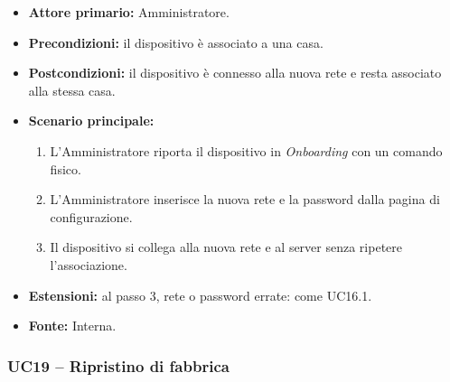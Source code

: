 \documentclass[12pt,a4paper]{article}
\newcommand{\tightlist}{\setlength{\itemsep}{1pt}\setlength{\parskip}{0pt}}
\begin{document}
\begin{itemize}

\tightlist

\item \textbf{Attore primario:} Amministratore.

\item \textbf{Precondizioni:} il dispositivo è associato a una casa.

\item \textbf{Postcondizioni:} il dispositivo è connesso alla nuova rete e resta associato alla stessa casa.

\item \textbf{Scenario principale:}

\begin{enumerate}

\tightlist

\item L'Amministratore riporta il dispositivo in \emph{Onboarding} con un comando fisico.

\item L'Amministratore inserisce la nuova rete e la password dalla pagina di configurazione.

\item Il dispositivo si collega alla nuova rete e al server senza ripetere l'associazione.

\end{enumerate}

\item \textbf{Estensioni:} al passo 3, rete o password errate: come UC16.1.

\item \textbf{Fonte:} Interna.

\end{itemize}



\subsubsection{UC19 -- Ripristino di fabbrica}
\end{document}
